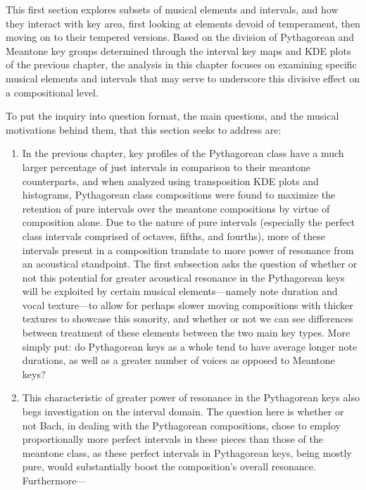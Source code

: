 This first section explores subsets of musical elements and intervals,
and how they interact with key area, first looking at elements devoid of
temperament, then moving on to their tempered versions. Based on the
division of Pythagorean and Meantone key groups determined through the
interval key maps and KDE plots of the previous chapter, the analysis in
this chapter focuses on examining specific musical elements and
intervals that may serve to underscore this divisive effect on a
compositional level.

To put the inquiry into question format, the main questions, and the
musical motivations behind them, that this section seeks to address are:

\begin{enumerate}
\def\labelenumi{\arabic{enumi}.}
\tightlist
\item
  In the previous chapter, key profiles of the Pythagorean class have a
  much larger percentage of just intervals in comparison to their
  meantone counterparts, and when analyzed using transposition KDE plots
  and histograms, Pythagorean class compositions were found to maximize
  the retention of pure intervals over the meantone compositions by
  virtue of composition alone. Due to the nature of pure intervals
  (especially the perfect class intervals comprised of octaves, fifths,
  and fourths), more of these intervals present in a composition
  translate to more power of resonance from an acoustical standpoint.
  The first subsection asks the question of whether or not this
  potential for greater acoustical resonance in the Pythagorean keys
  will be exploited by certain musical elements---namely note
  duration and vocal texture---to allow for perhaps slower moving
  compositions with thicker textures to showcase this sonority, and
  whether or not we can see differences between treatment of these
  elements between the two main key types. More simply put: do
  Pythagorean keys as a whole tend to have average longer note
  durations, as well as a greater number of voices as opposed to
  Meantone keys?
\item
  This characteristic of greater power of resonance in the Pythagorean
  keys also begs investigation on the interval domain. The question here
  is whether or not Bach, in dealing with the Pythagorean compositions,
  chose to employ proportionally more perfect intervals in these pieces
  than those of the meantone class, as these perfect intervals in
  Pythagorean keys, being mostly pure, would substantially boost the
  composition's overall resonance. Furthermore---

\end{enumerate}
